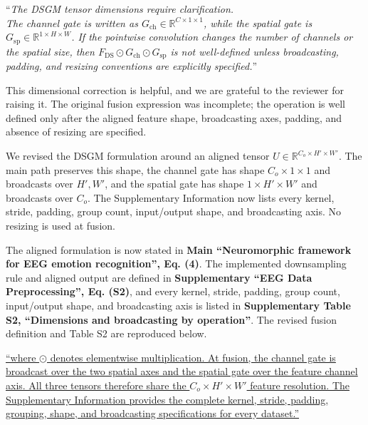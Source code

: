 \documentclass[12pt,technote,onecolumn]{IEEEtran}
\begin{document}
\vspace{4mm}

``{\it The DSGM tensor dimensions require clarification.\\
The channel gate is written as
\(G_{\mathrm{ch}} \in \mathbb{R}^{C\times1\times1}\), while the spatial
gate is \(G_{\mathrm{sp}} \in \mathbb{R}^{1\times H\times W}\). If the
pointwise convolution changes the number of channels or the spatial
size, then
\(F_{\mathrm{DS}} \odot G_{\mathrm{ch}} \odot G_{\mathrm{sp}}\) is not
well-defined unless broadcasting, padding, and resizing conventions are
explicitly specified.}''
\vspace{1mm}


This dimensional correction is helpful, and we are grateful to the reviewer for raising it. The original fusion expression was incomplete; the operation is well defined only after the aligned feature shape, broadcasting axes, padding, and absence of resizing are specified.

We revised the DSGM formulation around an aligned tensor
\(U\in\mathbb{R}^{C_o\times H'\times W'}\). The main path preserves this
shape, the channel gate has shape \(C_o\times1\times1\) and broadcasts
over \(H',W'\), and the spatial gate has shape \(1\times H'\times W'\)
and broadcasts over \(C_o\). The Supplementary Information now lists
every kernel, stride, padding, group count, input/output shape, and
broadcasting axis. No resizing is used at fusion.



The aligned formulation is now stated in \textbf{Main ``Neuromorphic framework for EEG emotion recognition'', Eq. (4)}. The implemented downsampling rule and aligned output are defined in \textbf{Supplementary ``EEG Data Preprocessing'', Eq. (S2)}, and every kernel, stride, padding, group count, input/output shape, and broadcasting axis is listed in \textbf{Supplementary Table S2, ``Dimensions and broadcasting by operation''}. The revised fusion definition and Table S2 are reproduced below.

\uline{``where $\odot$ denotes elementwise multiplication. At fusion, the channel gate is broadcast over the two spatial axes and the spatial gate over the feature channel axis. All three tensors therefore share the $C_o\times H'\times W'$ feature resolution. The Supplementary Information provides the complete kernel, stride, padding, grouping, shape, and broadcasting specifications for every dataset.''}
\end{document}
